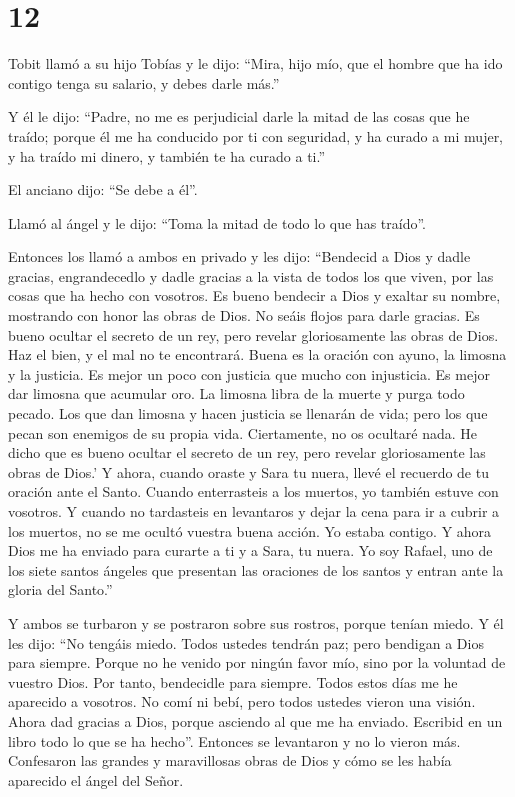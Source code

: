 \hypertarget{section-11}{%
\section{12}\label{section-11}}

 Tobit llamó a su hijo Tobías y le dijo: ``Mira, hijo mío,
que el hombre que ha ido contigo tenga su salario, y debes darle más.''

 Y él le dijo: ``Padre, no me es perjudicial darle la
mitad de las cosas que he traído;  porque él me ha
conducido por ti con seguridad, y ha curado a mi mujer, y ha traído mi
dinero, y también te ha curado a ti.''

 El anciano dijo: ``Se debe a él''.

 Llamó al ángel y le dijo: ``Toma la mitad de todo lo que
has traído''.

 Entonces los llamó a ambos en privado y les dijo:
``Bendecid a Dios y dadle gracias, engrandecedlo y dadle gracias a la
vista de todos los que viven, por las cosas que ha hecho con vosotros.
Es bueno bendecir a Dios y exaltar su nombre, mostrando con honor las
obras de Dios. No seáis flojos para darle gracias.  Es
bueno ocultar el secreto de un rey, pero revelar gloriosamente las obras
de Dios. Haz el bien, y el mal no te encontrará.  Buena es
la oración con ayuno, la limosna y la justicia. Es mejor un poco con
justicia que mucho con injusticia. Es mejor dar limosna que acumular
oro.  La limosna libra de la muerte y purga todo pecado.
Los que dan limosna y hacen justicia se llenarán de vida;
 pero los que pecan son enemigos de su propia vida.
 Ciertamente, no os ocultaré nada. He dicho que es bueno
ocultar el secreto de un rey, pero revelar gloriosamente las obras de
Dios.'  Y ahora, cuando oraste y Sara tu nuera, llevé el
recuerdo de tu oración ante el Santo. Cuando enterrasteis a los muertos,
yo también estuve con vosotros.  Y cuando no tardasteis
en levantaros y dejar la cena para ir a cubrir a los muertos, no se me
ocultó vuestra buena acción. Yo estaba contigo.  Y ahora
Dios me ha enviado para curarte a ti y a Sara, tu nuera. 
Yo soy Rafael, uno de los siete santos ángeles que presentan las
oraciones de los santos y entran ante la gloria del Santo.''

 Y ambos se turbaron y se postraron sobre sus rostros,
porque tenían miedo.  Y él les dijo: ``No tengáis miedo.
Todos ustedes tendrán paz; pero bendigan a Dios para siempre.
 Porque no he venido por ningún favor mío, sino por la
voluntad de vuestro Dios. Por tanto, bendecidle para siempre.
 Todos estos días me he aparecido a vosotros. No comí ni
bebí, pero todos ustedes vieron una visión.  Ahora dad
gracias a Dios, porque asciendo al que me ha enviado. Escribid en un
libro todo lo que se ha hecho''.  Entonces se levantaron
y no lo vieron más.  Confesaron las grandes y
maravillosas obras de Dios y cómo se les había aparecido el ángel del
Señor.


